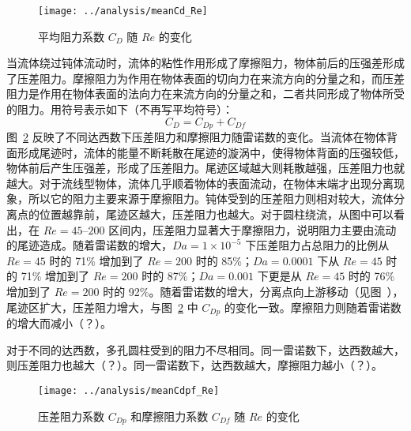 \begin{figure}
	\centering
	\texttt{[image: ../analysis/meanCd\_Re]}
	\caption{平均阻力系数 $C_D$ 随 $Re$ 的变化}
	\label{fig: meanCd}
\end{figure}

当流体绕过钝体流动时，流体的粘性作用形成了摩擦阻力，物体前后的压强差形成了压差阻力。摩擦阻力为作用在物体表面的切向力在来流方向的分量之和，而压差阻力是作用在物体表面的法向力在来流方向的分量之和，二者共同形成了物体所受的阻力。用符号表示如下（不再写平均符号）：
\begin{equation}
	C_D = C_{Dp} + C_{Df}
\end{equation}
图~\ref{fig: meanCdpf} 反映了不同达西数下压差阻力和摩擦阻力随雷诺数的变化。当流体在物体背面形成尾迹时，流体的能量不断耗散在尾迹的漩涡中，使得物体背面的压强较低，物体前后产生压强差，形成了压差阻力。尾迹区域越大则耗散越强，压差阻力也就越大。对于流线型物体，流体几乎顺着物体的表面流动，在物体末端才出现分离现象，所以它的阻力主要来源于摩擦阻力。钝体受到的压差阻力则相对较大，流体分离点的位置越靠前，尾迹区越大，压差阻力也越大。对于圆柱绕流，从图中可以看出，在 $Re=45$--$200$ 区间内，压差阻力显著大于摩擦阻力，说明阻力主要由流动的尾迹造成。随着雷诺数的增大，$Da=1\times 10^{-5}$ 下压差阻力占总阻力的比例从 $Re=45$ 时的 71\% 增加到了 $Re=200$ 时的 85\%；$Da=0.0001$ 下从 $Re=45$ 时的 71\% 增加到了 $Re=200$ 时的 87\%；$Da=0.001$ 下更是从 $Re=45$ 时的 76\% 增加到了 $Re=200$ 时的 92\%。随着雷诺数的增大，分离点向上游移动（见图~），尾迹区扩大，压差阻力增大，与图~\ref{fig: meanCdpf} 中 $C_{Dp}$ 的变化一致。摩擦阻力则随着雷诺数的增大而减小（？）。

对于不同的达西数，多孔圆柱受到的阻力不尽相同。同一雷诺数下，达西数越大，则压差阻力也越大（？）。同一雷诺数下，达西数越大，摩擦阻力越小（？）。

\begin{figure}
	\centering
	\texttt{[image: ../analysis/meanCdpf\_Re]}
	\caption{压差阻力系数 $C_{Dp}$ 和摩擦阻力系数 $C_{Df}$ 随 $Re$ 的变化}
	\label{fig: meanCdpf}
\end{figure}

